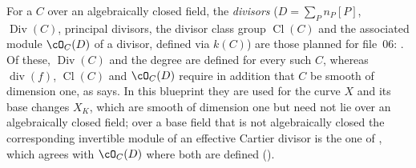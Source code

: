 \begin{remark}
\label{rem:pc-sc-divisor}
For a  $C$ over an algebraically closed
field, the \emph{divisors} ($D=\sum_Pn_P[P]$, $\operatorname{Div}(C)$,
principal divisors, the divisor class group $\operatorname{Cl}(C)$ and
the associated module $\cO_C(D)$ of a divisor, defined via $k(C)$) are
those planned for file~06: .  Of these, $\operatorname{Div}(C)$
and the degree are defined for every such $C$, whereas
$\operatorname{div}(f)$, $\operatorname{Cl}(C)$ and $\cO_C(D)$ require in
addition that $C$ be smooth of dimension one, as 
says.  In this blueprint they are used for the curve $X$ and its base
changes $X_K$, which are smooth of dimension one but need not lie over
an algebraically closed field; over a base field that is not
algebraically closed the corresponding invertible module of an
effective Cartier divisor is the one of
, which agrees with $\cO_C(D)$ where
both are defined ().
\end{remark}



